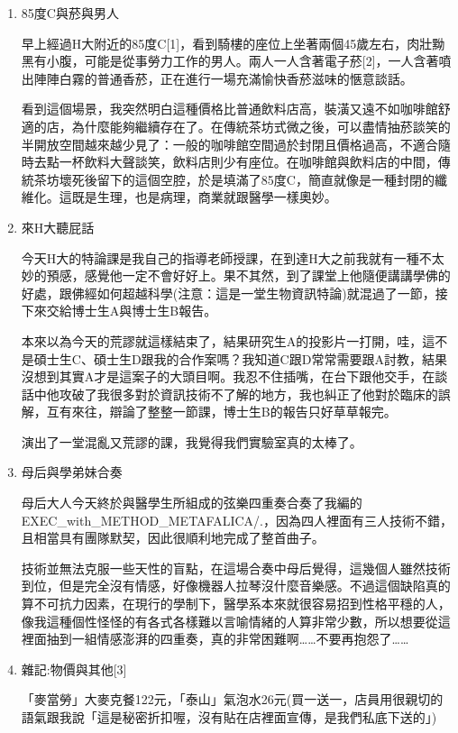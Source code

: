 \documentclass[
]{article}
\begin{document}
\begin{enumerate}
\def\labelenumi{\arabic{enumi}.}
\item
  85度C與菸與男人

  早上經過H大附近的85度C{[}1{]}，看到騎樓的座位上坐著兩個45歲左右，肉壯黝黑有小腹，可能是從事勞力工作的男人。兩人一人含著電子菸{[}2{]}，一人含著噴出陣陣白霧的普通香菸，正在進行一場充滿愉快香菸滋味的愜意談話。

  看到這個場景，我突然明白這種價格比普通飲料店高，裝潢又遠不如咖啡館舒適的店，為什麼能夠繼續存在了。在傳統茶坊式微之後，可以盡情抽菸談笑的半開放空間越來越少見了：一般的咖啡館空間過於封閉且價格過高，不適合隨時去點一杯飲料大聲談笑，飲料店則少有座位。在咖啡館與飲料店的中間，傳統茶坊壞死後留下的這個空腔，於是填滿了85度C，簡直就像是一種封閉的纖維化。這既是生理，也是病理，商業就跟醫學一樣奧妙。
\item
  來H大聽屁話

  今天H大的特論課是我自己的指導老師授課，在到達H大之前我就有一種不太妙的預感，感覺他一定不會好好上。果不其然，到了課堂上他隨便講講學佛的好處，跟佛經如何超越科學(注意：這是一堂生物資訊特論)就混過了一節，接下來交給博士生A與博士生B報告。

  本來以為今天的荒謬就這樣結束了，結果研究生A的投影片一打開，哇，這不是碩士生C、碩士生D跟我的合作案嗎？我知道C跟D常常需要跟A討教，結果沒想到其實A才是這案子的大頭目啊。我忍不住插嘴，在台下跟他交手，在談話中他攻破了我很多對於資訊技術不了解的地方，我也糾正了他對於臨床的誤解，互有來往，辯論了整整一節課，博士生B的報告只好草草報完。

  演出了一堂混亂又荒謬的課，我覺得我們實驗室真的太棒了。
\item
  母后與學弟妹合奏

  母后大人今天終於與醫學生所組成的弦樂四重奏合奏了我編的EXEC\_with\_METHOD\_METAFALICA/.，因為四人裡面有三人技術不錯，且相當具有團隊默契，因此很順利地完成了整首曲子。

  技術並無法克服一些天性的盲點，在這場合奏中母后覺得，這幾個人雖然技術到位，但是完全沒有情感，好像機器人拉琴沒什麼音樂感。不過這個缺陷真的算不可抗力因素，在現行的學制下，醫學系本來就很容易招到性格平穩的人，像我這種個性怪怪的有各式各樣難以言喻情緒的人算非常少數，所以想要從這裡面抽到一組情感澎湃的四重奏，真的非常困難啊\ldots\ldots 不要再抱怨了\ldots\ldots{}
\item
  雜記:物價與其他{[}3{]}

  「麥當勞」大麥克餐122元，「泰山」氣泡水26元(買一送一，店員用很親切的語氣跟我說「這是秘密折扣喔，沒有貼在店裡面宣傳，是我們私底下送的」)
\end{enumerate}
\end{document}

